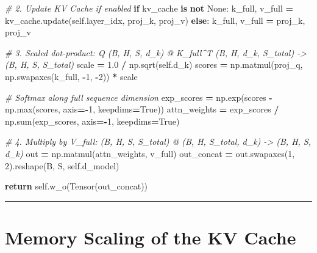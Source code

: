 \documentclass[
  letterpaper,
]{scrbook}
\newenvironment{Shaded}{\begin{snugshade}}{\end{snugshade}}
\newcommand{\BuiltInTok}[1]{#1}
\newcommand{\CommentTok}[1]{\textcolor[rgb]{0.56,0.35,0.01}{\textit{#1}}}
\newcommand{\ControlFlowTok}[1]{\textcolor[rgb]{0.13,0.29,0.53}{\textbf{#1}}}
\newcommand{\DecValTok}[1]{\textcolor[rgb]{0.00,0.00,0.81}{#1}}
\newcommand{\FloatTok}[1]{\textcolor[rgb]{0.00,0.00,0.81}{#1}}
\newcommand{\KeywordTok}[1]{\textcolor[rgb]{0.13,0.29,0.53}{\textbf{#1}}}
\newcommand{\NormalTok}[1]{#1}
\newcommand{\OperatorTok}[1]{\textcolor[rgb]{0.81,0.36,0.00}{\textbf{#1}}}
\newcommand{\VariableTok}[1]{\textcolor[rgb]{0.00,0.00,0.00}{#1}}
\begin{document}
\begin{Shaded}
\begin{Highlighting}[]
        \CommentTok{\# 2. Update KV Cache if enabled}
        \ControlFlowTok{if}\NormalTok{ kv\_cache }\KeywordTok{is} \KeywordTok{not} \VariableTok{None}\NormalTok{:}
\NormalTok{            k\_full, v\_full }\OperatorTok{=}\NormalTok{ kv\_cache.update(}\VariableTok{self}\NormalTok{.layer\_idx, proj\_k, proj\_v)}
        \ControlFlowTok{else}\NormalTok{:}
\NormalTok{            k\_full, v\_full }\OperatorTok{=}\NormalTok{ proj\_k, proj\_v}

        \CommentTok{\# 3. Scaled dot{-}product: Q (B, H, S, d\_k) @ K\_full\^{}T (B, H, d\_k, S\_total) {-}\textgreater{} (B, H, S, S\_total)}
\NormalTok{        scale }\OperatorTok{=} \FloatTok{1.0} \OperatorTok{/}\NormalTok{ np.sqrt(}\VariableTok{self}\NormalTok{.d\_k)}
\NormalTok{        scores }\OperatorTok{=}\NormalTok{ np.matmul(proj\_q, np.swapaxes(k\_full, }\OperatorTok{{-}}\DecValTok{1}\NormalTok{, }\OperatorTok{{-}}\DecValTok{2}\NormalTok{)) }\OperatorTok{*}\NormalTok{ scale}

        \CommentTok{\# Softmax along full sequence dimension}
\NormalTok{        exp\_scores }\OperatorTok{=}\NormalTok{ np.exp(scores }\OperatorTok{{-}}\NormalTok{ np.}\BuiltInTok{max}\NormalTok{(scores, axis}\OperatorTok{={-}}\DecValTok{1}\NormalTok{, keepdims}\OperatorTok{=}\VariableTok{True}\NormalTok{))}
\NormalTok{        attn\_weights }\OperatorTok{=}\NormalTok{ exp\_scores }\OperatorTok{/}\NormalTok{ np.}\BuiltInTok{sum}\NormalTok{(exp\_scores, axis}\OperatorTok{={-}}\DecValTok{1}\NormalTok{, keepdims}\OperatorTok{=}\VariableTok{True}\NormalTok{)}

        \CommentTok{\# 4. Multiply by V\_full: (B, H, S, S\_total) @ (B, H, S\_total, d\_k) {-}\textgreater{} (B, H, S, d\_k)}
\NormalTok{        out }\OperatorTok{=}\NormalTok{ np.matmul(attn\_weights, v\_full)}
\NormalTok{        out\_concat }\OperatorTok{=}\NormalTok{ out.swapaxes(}\DecValTok{1}\NormalTok{, }\DecValTok{2}\NormalTok{).reshape(B, S, }\VariableTok{self}\NormalTok{.d\_model)}

        \ControlFlowTok{return} \VariableTok{self}\NormalTok{.w\_o(Tensor(out\_concat))}
\end{Highlighting}
\end{Shaded}

\begin{center}\rule{0.5\linewidth}{0.5pt}\end{center}

\section{Memory Scaling of the KV
Cache}\label{memory-scaling-of-the-kv-cache}
\end{document}
